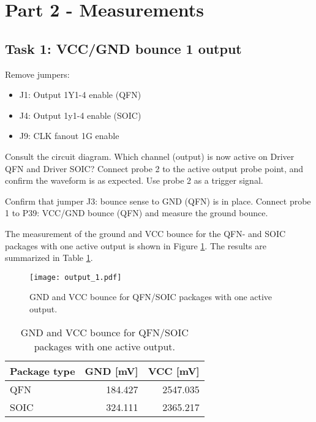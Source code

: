 \documentclass[../main.tex]{subfiles}
\begin{document}
\section{Part 2 - Measurements}

\subsection{Task 1: VCC/GND bounce 1 output}

Remove jumpers:

\begin{itemize}
    \item J1: Output 1Y1-4 enable (QFN)
    \item J4: Output 1y1-4 enable (SOIC)
    \item J9: CLK fanout 1G enable
\end{itemize}

Consult the circuit diagram. Which channel (output) is now active on Driver QFN and Driver SOIC? Connect probe 2 to the active output probe point, and confirm the waveform is as expected. Use probe 2 as a trigger signal.

\vspace{10pt}

Confirm that jumper J3: bounce sense to GND (QFN) is in place. Connect probe 1 to P39: VCC/GND bounce (QFN) and measure the ground bounce.

\solution

The measurement of the ground and VCC bounce for the QFN- and SOIC packages with one active output is shown in Figure \ref{fig:gnd_vcc_output_1}. The results are summarized in Table \ref{tab:output_1}.

\begin{figure}[h]
    \centering
    \texttt{[image: output\_1.pdf]}
    \caption{GND and VCC bounce for QFN/SOIC packages with one active output.}
    \label{fig:gnd_vcc_output_1}
\end{figure}

\begin{table}[h]
    \centering
    \begin{tabular}{l | r r}
        \toprule[1pt]
        Package type    & GND [mV]  & VCC [mV]\\
        \midrule
        QFN             & 184.427   & 2547.035  \\
        SOIC            & 324.111   & 2365.217  \\
        \bottomrule[1pt]
    \end{tabular}
    \caption{GND and VCC bounce for QFN/SOIC packages with one active output.}
    \label{tab:output_1}
\end{table}
\end{document}
